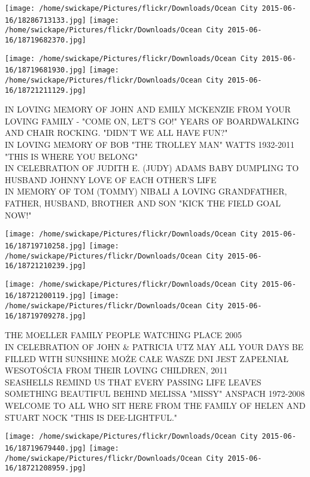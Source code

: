\documentclass[10pt,letterpaper]{article}
\begin{document}
\texttt{[image: /home/swickape/Pictures/flickr/Downloads/Ocean City 2015-06-16/18286713133.jpg]}
\texttt{[image: /home/swickape/Pictures/flickr/Downloads/Ocean City 2015-06-16/18719682370.jpg]}

\texttt{[image: /home/swickape/Pictures/flickr/Downloads/Ocean City 2015-06-16/18719681930.jpg]}
\texttt{[image: /home/swickape/Pictures/flickr/Downloads/Ocean City 2015-06-16/18721211129.jpg]}

IN LOVING MEMORY OF JOHN AND EMILY MCKENZIE FROM YOUR LOVING FAMILY {-} "COME ON, LET'S GO!"  YEARS OF BOARDWALKING AND CHAIR ROCKING.  "DIDN'T WE ALL HAVE FUN?"\\
IN LOVING MEMORY OF BOB "THE TROLLEY MAN" WATTS 1932{-}2011 "THIS IS WHERE YOU BELONG"\\
IN CELEBRATION OF JUDITH E. (JUDY) ADAMS BABY DUMPLING TO HUSBAND JOHNNY LOVE OF EACH OTHER'S LIFE\\
IN MEMORY OF TOM (TOMMY) NIBALI A LOVING GRANDFATHER, FATHER, HUSBAND, BROTHER AND SON "KICK THE FIELD GOAL NOW!"\\
\pagebreak

\texttt{[image: /home/swickape/Pictures/flickr/Downloads/Ocean City 2015-06-16/18719710258.jpg]}
\texttt{[image: /home/swickape/Pictures/flickr/Downloads/Ocean City 2015-06-16/18721210239.jpg]}

\texttt{[image: /home/swickape/Pictures/flickr/Downloads/Ocean City 2015-06-16/18721200119.jpg]}
\texttt{[image: /home/swickape/Pictures/flickr/Downloads/Ocean City 2015-06-16/18719709278.jpg]}

THE MOELLER FAMILY PEOPLE WATCHING PLACE 2005\\
IN CELEBRATION OF JOHN \& PATRICIA UTZ MAY ALL YOUR DAYS BE FILLED WITH SUNSHINE MOŻE CAŁE WASZE DNI JEST ZAPEŁNIAŁ WESOTOŚCIA FROM THEIR LOVING CHILDREN, 2011\\
SEASHELLS REMIND US THAT EVERY PASSING LIFE LEAVES SOMETHING BEAUTIFUL BEHIND MELISSA "MISSY" ANSPACH 1972{-}2008\\
WELCOME TO ALL WHO SIT HERE FROM THE FAMILY OF HELEN AND STUART NOCK "THIS IS DEE{-}LIGHTFUL."\\
\pagebreak

\texttt{[image: /home/swickape/Pictures/flickr/Downloads/Ocean City 2015-06-16/18719679440.jpg]}
\texttt{[image: /home/swickape/Pictures/flickr/Downloads/Ocean City 2015-06-16/18721208959.jpg]}
\end{document}
